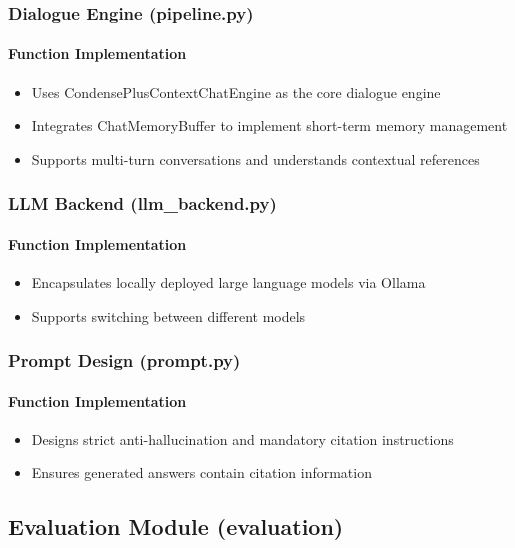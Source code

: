 \subsubsection{Dialogue Engine (pipeline.py)}

\paragraph{Function Implementation}
\begin{itemize}
    \item Uses CondensePlusContextChatEngine as the core dialogue engine
    \item Integrates ChatMemoryBuffer to implement short-term memory management
    \item Supports multi-turn conversations and understands contextual references
\end{itemize}

\subsubsection{LLM Backend (llm\_backend.py)}

\paragraph{Function Implementation}
\begin{itemize}
    \item Encapsulates locally deployed large language models via Ollama
    \item Supports switching between different models
\end{itemize}

\subsubsection{Prompt Design (prompt.py)}

\paragraph{Function Implementation}
\begin{itemize}
    \item Designs strict anti-hallucination and mandatory citation instructions
    \item Ensures generated answers contain citation information
\end{itemize}

\subsection{Evaluation Module (evaluation)}

